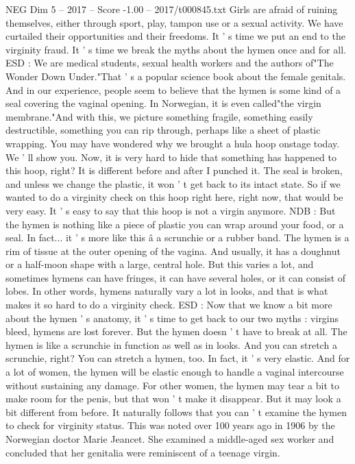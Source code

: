 \begin{textsample}{NEG Dim 5 – 2017 – Score -1.00 – 2017/t000845.txt}
Girls are afraid of ruining themselves, either through sport, play, tampon use or a sexual activity.
We have curtailed their opportunities and their freedoms.
It ' s time we put an end to the virginity fraud.
It ' s time we break the myths about the hymen once and for all.
ESD : We are medical students, sexual health workers and the authors of"The Wonder Down Under."That ' s a popular science book about the female genitals.
And in our experience, people seem to believe that the hymen is some kind of a seal covering the vaginal opening.
In Norwegian, it is even called"the virgin membrane."And with this, we picture something fragile, something easily destructible, something you can rip through, perhaps like a sheet of plastic wrapping.
You may have wondered why we brought a hula hoop onstage today.
We ' ll show you.
Now, it is very hard to hide that something has happened to this hoop, right?
It is different before and after I punched it.
The seal is broken, and unless we change the plastic, it won ' t get back to its intact state.
So if we wanted to do a virginity check on this hoop right here, right now, that would be very easy.
It ' s easy to say that this hoop is not a virgin anymore.
NDB : But the hymen is nothing like a piece of plastic you can wrap around your food, or a seal.
In fact... it ' s more like this â a scrunchie or a rubber band.
The hymen is a rim of tissue at the outer opening of the vagina.
And usually, it has a doughnut or a half-moon shape with a large, central hole.
But this varies a lot, and sometimes hymens can have fringes, it can have several holes, or it can consist of lobes.
In other words, hymens naturally vary a lot in looks, and that is what makes it so hard to do a virginity check.
ESD : Now that we know a bit more about the hymen ' s anatomy, it ' s time to get back to our two myths : virgins bleed, hymens are lost forever.
But the hymen doesn ' t have to break at all.
The hymen is like a scrunchie in function as well as in looks.
And you can stretch a scrunchie, right?
You can stretch a hymen, too.
In fact, it ' s very elastic.
And for a lot of women, the hymen will be elastic enough to handle a vaginal intercourse without sustaining any damage.
For other women, the hymen may tear a bit to make room for the penis, but that won ' t make it disappear.
But it may look a bit different from before.
It naturally follows that you can ' t examine the hymen to check for virginity status.
This was noted over 100 years ago in 1906 by the Norwegian doctor Marie Jeancet.
She examined a middle-aged sex worker and concluded that her genitalia were reminiscent of a teenage virgin.

\end{textsample}
